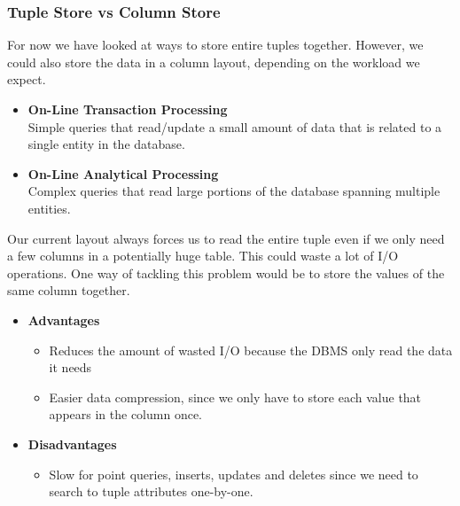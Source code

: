 \subsubsection{Tuple Store vs Column Store}
For now we have looked at ways to store entire tuples together. However, we could also store the data in a column layout, depending on the workload we expect.
\begin{itemize}
\item \textbf{On-Line Transaction Processing}\\
Simple queries that read/update a small amount of data that is related to a single entity in the database.
\item \textbf{On-Line Analytical Processing}\\
Complex queries that read large portions of the database spanning multiple entities.
\end{itemize}
Our current layout always forces us to read the entire tuple even if we only need a few columns in a potentially huge table. This could waste a lot of I/O operations. One way of tackling this problem would be to store the values of the same column together.
\begin{itemize}
\item \textbf{Advantages}
\begin{itemize}
\item Reduces the amount of wasted I/O because the DBMS only read the data it needs
\item Easier data compression, since we only have to store each value that appears in the column once.
\end{itemize}
\item \textbf{Disadvantages}
\begin{itemize}
\item Slow for point queries, inserts, updates and deletes since we need to search to tuple attributes one-by-one.
\end{itemize}
\end{itemize}


